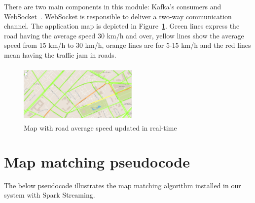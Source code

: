 \documentclass{acm_proc_article-sp}
\begin{document}
There are two main components in this module: Kafka's consumers and WebSocket~\cite{websocket}. WebSocket is responsible to deliver a two-way communication channel. The application map is depicted in Figure~\ref{fig:app}. Green lines express the road having the average speed 30 km/h and over, yellow lines show the average speed from 15 km/h to 30 km/h, orange lines are for 5-15 km/h and the red lines mean having the traffic jam in roads. 

	\begin{figure}[h]
		\centering
		\includegraphics[height=110px,width=220px]{Picture1}
		\caption{Map with road average speed updated in real-time}
		\label{fig:app}
	\end{figure}


\section{Map matching pseudocode} 
\medskip
\noindent
The below pseudocode illustrates the map matching algorithm installed in our system with Spark Streaming. 
\end{document}
